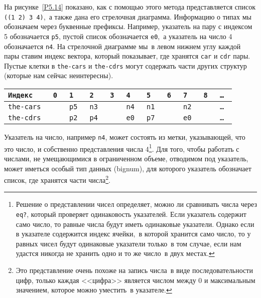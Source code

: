 На рисунке~\ref{P5.14} показано, как с помощью этого
метода представляется список {\tt ((1 2) 3 4)},~а также
дана его стрелочная диаграмма. Информацию о типах мы
обозначаем через буквенные префиксы.  Например, указатель на пару с
индексом 5 обозначается {\tt p5}, пустой список обозначается
{\tt e0},~а указатель на число 4 обозначается
{\tt n4}. На стрелочной диаграмме мы~в левом нижнем
углу каждой пары ставим индекс вектора, который показывает, где
хранятся {\tt car} и {\tt cdr} пары. Пустые клетки в
{\tt the-cars} и {\tt the-cdrs} могут содержать части
других структур (которые нам сейчас неинтересны).


\begin{cntrfig}


\bigskip

\begin{tabular}{|l|l|l|l|l|l|l|l|l|l|l|}
\hline
\tt{Индекс}   & \tt{0} & \tt{1} & \tt{2} & \tt{3} & \tt{4} & \tt{5} & \tt{6} & \tt{7} & \tt{8} & \tt{\dots} \\ \hline
\tt{the-cars} & & \tt{p5} & \tt{n3} & & \tt{n4} & \tt{n1} & & \tt{n2} & & \tt{\dots} \\ \hline
{\tt the-cdrs}& & \tt{p2} & \tt{p4} & & \tt{e0} & \tt{p7} & & \tt{e0} & & \tt{\dots} \\ \hline
\end{tabular}

\caption{Представления списка {\tt ((1 2) 3 4)} 
в виде стрелочной диаграммы и~в виде вектора памяти.}
\label{P5.14}

\end{cntrfig}
Указатель на число, например {\tt n4}, может
состоять из метки, указывающей, что это число, и собственно
представления числа 
4\footnote{Решение 
о представлении чисел определяет, можно ли
сравнивать числа через {\tt eq?},
который проверяет
одинаковость указателей. Если указатель содержит само число, то
равные числа будут иметь одинаковые указатели.  Однако если в
указателе содержится индекс ячейки,~в которой хранится само число, то
у равных чисел будут одинаковые указатели только~в том случае, если
нам удастся никогда не хранить одно и то же число~в двух местах.}.
Для того, чтобы работать с числами, не умещающимися
в ограниченном объеме, отводимом под указатель, может иметься особый
тип данных  (bignum), для
которого указатель обозначает список, где хранятся части
числа\footnote{Это представление очень похоже на запись числа~в виде
последовательности цифр, только каждая <<цифра>> является числом между
0 и максимальным значением, которое можно уместить~в указателе.}.

